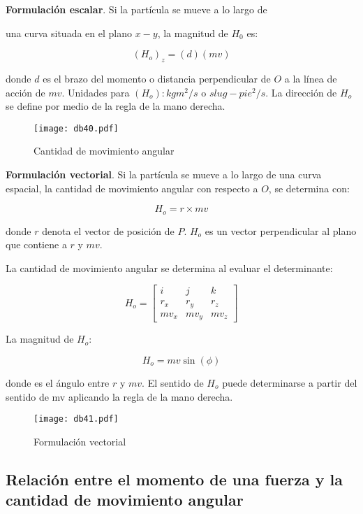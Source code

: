 \textbf{Formulación escalar}. Si la partícula se mueve a lo largo de

una curva situada en el plano $x-y$, la magnitud de $H_0$ es:

\begin{equation}
    (H_o)_z = (d)(mv)
\end{equation}

donde $d$ es el brazo del momento o distancia perpendicular de $O$ a la línea de acción de $mv$. Unidades para $(H_o): kg m^2/s$ o $slug-pie^2/s$. La dirección de $H_o$ se define por medio de la regla de la mano derecha.
\begin{figure}[h!]
\centering
  \texttt{[image: db40.pdf]}
  \caption{Cantidad de movimiento angular}
  \label{db40}
\end{figure}

\textbf{Formulación vectorial}. Si la partícula se mueve a lo largo de una curva espacial, la cantidad de movimiento angular con respecto a $O$, se determina con:

\begin{equation}
    H_o = r \times mv
\end{equation}

donde $r$ denota el vector de posición de $P$. $H_o$ es un vector perpendicular al plano que contiene a $r$ y $mv$.

La cantidad de movimiento angular se determina al evaluar el determinante:

\begin{equation}
    H_o = \begin{bmatrix}
        i&j&k\\
        r_x&r_y&r_z\\
        mv_x&mv_y&mv_z
    \end{bmatrix}
\end{equation}

La magnitud de $H_o$:

\begin{equation}
    H_o = mv \sin{(\phi)} 
\end{equation}

donde es el ángulo entre $r$ y $mv$. El sentido de $H_o$ puede determinarse a partir del sentido de mv aplicando la regla de la mano derecha.
\begin{figure}[h!]
\centering
  \texttt{[image: db41.pdf]}
  \caption{Formulación vectorial}
  \label{db41}
\end{figure}

\subsection{Relación entre el momento de una fuerza y la cantidad de movimiento angular}


